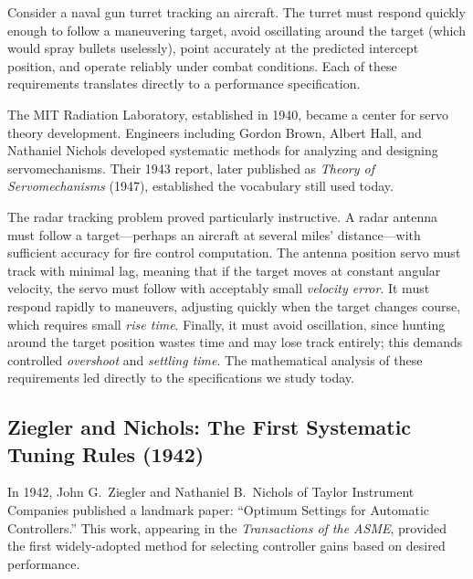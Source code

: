 \begin{historicalbox}
Consider a naval gun turret tracking an aircraft. The turret must respond quickly enough to follow a maneuvering target, avoid oscillating around the target (which would spray bullets uselessly), point accurately at the predicted intercept position, and operate reliably under combat conditions. Each of these requirements translates directly to a performance specification.
\end{historicalbox}

The MIT Radiation Laboratory, established in 1940, became a center for servo theory development. Engineers including Gordon Brown, Albert Hall, and Nathaniel Nichols developed systematic methods for analyzing and designing servomechanisms. Their 1943 report, later published as \textit{Theory of Servomechanisms} (1947), established the vocabulary still used today.

The radar tracking problem proved particularly instructive. A radar antenna must follow a target---perhaps an aircraft at several miles' distance---with sufficient accuracy for fire control computation. The antenna position servo must track with minimal lag, meaning that if the target moves at constant angular velocity, the servo must follow with acceptably small \textit{velocity error}. It must respond rapidly to maneuvers, adjusting quickly when the target changes course, which requires small \textit{rise time}. Finally, it must avoid oscillation, since hunting around the target position wastes time and may lose track entirely; this demands controlled \textit{overshoot} and \textit{settling time}. The mathematical analysis of these requirements led directly to the specifications we study today.

\subsection{Ziegler and Nichols: The First Systematic Tuning Rules (1942)}

In 1942, John G.\ Ziegler and Nathaniel B.\ Nichols of Taylor Instrument Companies published a landmark paper: ``Optimum Settings for Automatic Controllers.'' This work, appearing in the \textit{Transactions of the ASME}, provided the first widely-adopted method for selecting controller gains based on desired performance.

